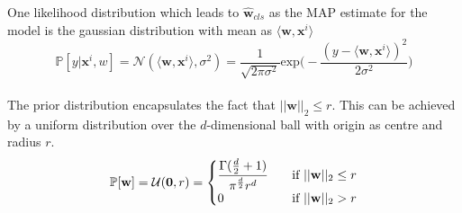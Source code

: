 \documentclass[a4paper,11pt]{article}
\begin{document}
\begin{mlsolution}
One likelihood distribution which leads to $\mathbf{\hat{w}}_{cls}$ as the MAP estimate for the model is the gaussian distribution with mean as $\langle \mathbf{w,x}^i \rangle$ \[
\mathbb{P}[y|\mathbf{x}^i,w] = \mathcal{N}(\langle \mathbf{w,x}^i \rangle,\sigma^2) = \frac{1}{\sqrt{2\pi\sigma^2}} \text{exp}\bigg(-\frac{(y-\langle \mathbf{w,x}^i \rangle)^2}{2\sigma^2}\bigg)
\]
\\The prior distribution encapsulates the fact that $||\mathbf{w}||_2 \leq r$. This can be achieved by a uniform distribution over the $d$-dimensional ball with origin as centre and radius $r$.\[
\mathbb{P}[\mathbf{w}] = \mathcal{U}(\mathbf{0},r) = 
     \begin{cases}
       \cfrac{\Gamma(\frac{d}{2} + 1)}{\pi^{\frac{d}{2}} r^d} &\quad\text{if }||\mathbf{w}||_2 \leq r\\
       0 &\quad\text{if }||\mathbf{w}||_2 > r\\
     \end{cases}
\]

\end{mlsolution}
\end{document}
